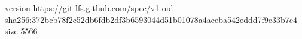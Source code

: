 version https://git-lfs.github.com/spec/v1
oid sha256:372bcb78f2c52db6fdb2df3b6593044d51b01078a4aeeba542eddd7f9c33b7c4
size 5566
